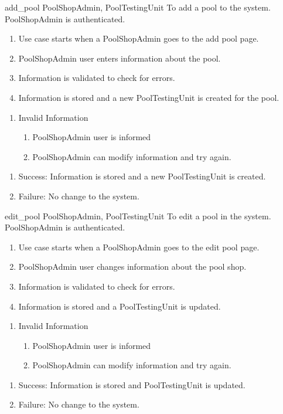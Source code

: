 \usecase
{add\_pool}
{PoolShopAdmin, PoolTestingUnit}
{To add a pool to the system.}
{PoolShopAdmin is authenticated.}
{
\begin{enumerate}
\item Use case starts when a PoolShopAdmin goes to the add pool page.
\item PoolShopAdmin user enters information about the pool.
\item Information is validated to check for errors.
\item Information is stored and a new PoolTestingUnit is created for the pool.
\end{enumerate}
}
{
\begin{enumerate}
\item Invalid Information
\begin{enumerate}
\item PoolShopAdmin user is informed
\item PoolShopAdmin can modify information and try again.
\end{enumerate}
\end{enumerate}
}
{
\begin{enumerate}
\item Success: Information is stored and a new PoolTestingUnit is created.
\item Failure: No change to the system.
\end{enumerate}
}

\usecase
{edit\_pool}
{PoolShopAdmin, PoolTestingUnit}
{To edit a pool in the system.}
{PoolShopAdmin is authenticated.}
{
\begin{enumerate}
\item Use case starts when a PoolShopAdmin goes to the edit pool page.
\item PoolShopAdmin user changes information about the pool shop.
\item Information is validated to check for errors.
\item Information is stored and a PoolTestingUnit is updated.
\end{enumerate}
}
{
\begin{enumerate}
\item Invalid Information
\begin{enumerate}
\item PoolShopAdmin user is informed
\item PoolShopAdmin can modify information and try again.
\end{enumerate}
\end{enumerate}
}
{
\begin{enumerate}
\item Success: Information is stored and PoolTestingUnit is updated.
\item Failure: No change to the system.
\end{enumerate}
}


